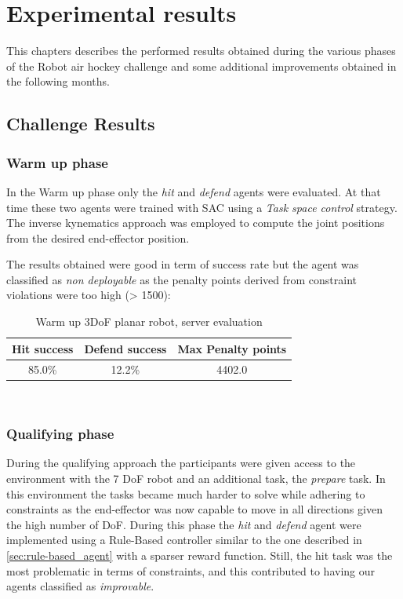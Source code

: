 \chapter{Experimental results}
\label{ch:experimental_results}

This chapters describes the performed results obtained during the various phases of the Robot air hockey challenge and some additional improvements obtained in the following months.

\section{Challenge Results}
\subsection{Warm up phase}
In the Warm up phase only the \textit{hit} and \textit{defend} agents were evaluated.
At that time these two agents were trained with SAC using a \textit{Task space control} strategy. The inverse kynematics approach was employed to compute the joint positions from
the desired end-effector position.

The results obtained were good in term of success rate but the agent was classified as \textit{non deployable} as the penalty points derived from constraint violations were
too high (> 1500):

\begin{table}[H]
    \centering 
    \begin{tabular}{|c | c | c |}
    \hline
     \textbf{Hit success} & \textbf{Defend success} & \textbf{Max Penalty points} \T\B \\
    \hline \hline
    85.0\% & 12.2\% & 4402.0 \T\B \\
    \hline
    \end{tabular}
    \\[10pt]
    \caption{Warm up 3DoF planar robot, server evaluation}
    \label{table:warm-up_results}
\end{table}

\subsection{Qualifying phase}
During the qualifying approach the participants were given access to the environment with the 7 DoF robot and an additional task, the \textit{prepare} task. 
In this environment the tasks became much harder to solve
while adhering to constraints as the end-effector was now capable to move in all directions given the high number of DoF. 
During this phase the \textit{hit} and \textit{defend} agent were implemented using a Rule-Based controller similar to the one described in \ref{sec:rule-based_agent} 
with a sparser reward function.
Still, the hit task was the most problematic in terms of constraints, and this contributed to having our agents classified as \textit{improvable}. 

